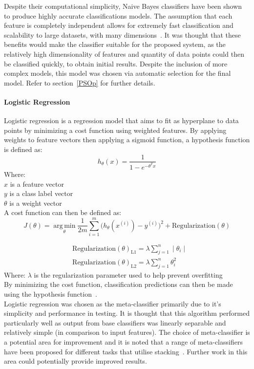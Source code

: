 \documentclass[titlepage, 12pt]{scrartcl} \usepackage{enumitem}
\DeclareMathOperator*{\argmin}{arg\,min}
\begin{document}
Despite their computational simplicity, Naive Bayes classifiers have been shown
to produce highly accurate classifications models. The assumption that each feature is
completely independent allows for extremely fast classification and scalability
to large datasets, with many dimensions~\parencite[p.300]{Zhang2004}. It was
thought that these benefits would make the classifier suitable for the proposed system, as the relatively high
dimensionality of features and quantity of data points could then be classified
quickly, to obtain initial results. Despite the inclusion of more complex
models, this model was chosen via automatic selection for the final model.
Refer to section~\ref{PSOp} for further details.

\paragraph{Logistic Regression}
Logistic regression is a regression model that aims to fit as hyperplane to
data points by minimizing a cost function using weighted features.
By applying weights to feature vectors then applying a sigmoid function, a
hypothesis function is defined as:
\begin{equation}
    h_\theta(x)=\frac{1}{1-e^{-\theta^{T}x}}
\end{equation}
Where:\\
$x$ is a feature vector\\
$y$ is a class label vector \\
$\theta$ is a weight vector \\
A cost function can then be defined as:
\begin{equation}
    J(\theta)=\argmin\limits_\theta\frac{1}{2m}\sum\limits_{i=1}^m\Big(h_\theta(x^{(i)})-y^{(i)}\Big)^2+\text{Regularization}(\theta)
\end{equation}

\begin{align}
    &\text{Regularization}{(\theta)}_\text{L1}=\lambda\sum\limits_{j=1}^n\mid\theta_i\mid\\
    &\text{Regularization}{(\theta)}_\text{L2}=\lambda\sum\limits_{j=1}^n\theta_i^2
\end{align}
Where:
$\lambda$ is the regularization parameter used to help prevent overfitting\\
By minimizing the cost function, classification predictions can then be made
using the hypothesis function~\parencite{Ng2012}.\\
Logistic regression was chosen as the meta-classifier primarily due to it's
simplicity and performance in testing. It is thought that this algorithm
performed particularly well as output from base classifiers was linearly
separable and relatively simple (in comparison to input features). The choice of
meta-classifier is a potential area for improvement and it is noted that a
range of meta-classifiers have been proposed for different tasks that utilise
stacking~\parencite[p.29]{Sesmero2015}. Further work in this area could
potentially provide improved results.
\end{document}
